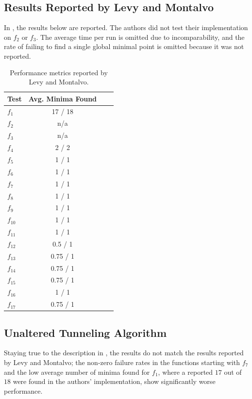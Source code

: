 \documentclass[a4paper,12pt,twoside]{article}
\begin{document}
\subsection{Results Reported by Levy and Montalvo}
In \cite[Table 1]{levy_tunneling_1985}, the results below are reported. The authors did not test their implementation on $f_2$ or $f_3$. The average time per run is omitted due to incomparability, and the rate of failing to find a single global minimal point is omitted because it was not reported.
\begin{table}[H]
    \centering
    \begin{tabular}{lccc}
        \hline
        \textbf{Test} & \textbf{Avg. Minima Found} \\
        \hline
        $f_1$ & 17 / 18 \\
        $f_2$ & n/a \\
        $f_3$ & n/a \\
        $f_4$ & 2 / 2 \\
        $f_5$ & 1 / 1 \\
        $f_6$ & 1 / 1 \\
        $f_7$ & 1 / 1 \\
        $f_8$ & 1 / 1 \\
        $f_9$ & 1 / 1 \\
        $f_{10}$ & 1 / 1 \\
        $f_{11}$ & 1 / 1 \\
        $f_{12}$ & 0.5 / 1 \\
        $f_{13}$ & 0.75 / 1 \\
        $f_{14}$ & 0.75 / 1 \\
        $f_{15}$ & 0.75 / 1 \\
        $f_{16}$ & 1 / 1 \\
        $f_{17}$ & 0.75 / 1 \\
        \hline
    \end{tabular}
    \caption{Performance metrics reported by Levy and Montalvo.}
    \label{tab:levy_montalvo_results}
\end{table}


\subsection{Unaltered Tunneling Algorithm} \label{sec:unaltered}

Staying true to the description in \cite{levy_tunneling_1985}, the results do not match the results reported by Levy and Montalvo; the non-zero failure rates in the functions starting with $f_7$ and the low average number of minima found for $f_1$, where a reported $17$ out of $18$ were found in the authors' implementation, show significantly worse performance. 
\end{document}
